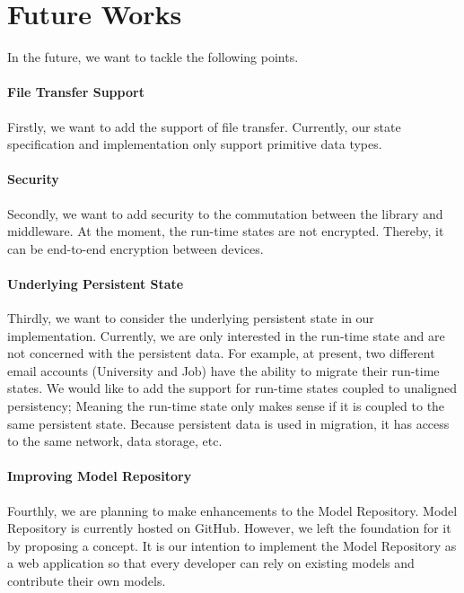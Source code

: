 \newpage
\section {Future Works}
In the future, we want to tackle the following points. 
\paragraph{File Transfer Support}
Firstly, we want to add the support of file transfer. Currently, our state specification and implementation only support primitive data types.

\paragraph{Security}
Secondly, we want to add security to the commutation between the library and middleware. At the moment, the run-time states are not encrypted. Thereby, it can be end-to-end encryption between devices.

\paragraph{Underlying Persistent State}
Thirdly, we want to consider the underlying persistent state in our implementation. Currently, we are only interested in the run-time state and are not concerned with the persistent data.
For example, at present, two different email accounts (University and Job) have the ability to migrate their run-time states. We would like to add the support for run-time states coupled to unaligned persistency; Meaning the run-time state only makes sense if it is coupled to the same persistent state. Because persistent data is used in migration, it has access to the same network, data storage, etc.

\paragraph{Improving Model Repository}
Fourthly, we are planning to make enhancements to the Model Repository. Model Repository is currently hosted on GitHub. However, we left the foundation for it by proposing a concept. It is our intention to implement the Model Repository as a web application so that every developer can rely on existing models and contribute their own models.

